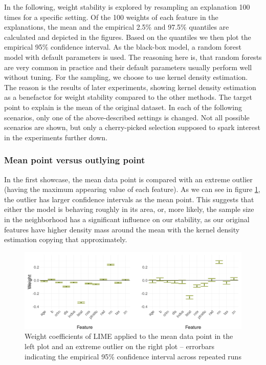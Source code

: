 \documentclass[]{krantz}
\begin{document}
In the following, weight stability is explored by resampling an
explanation 100 times for a specific setting. Of the 100 weights of each
feature in the explanations, the mean and the empirical 2.5\% and 97.5\%
quantiles are calculated and depicted in the figures. Based on the
quantiles we then plot the empirical 95\% confidence interval. As the
black-box model, a random forest model with default parameters is used.
The reasoning here is, that random forests are very common in practice
and their default parameters usually perform well without tuning. For
the sampling, we choose to use kernel density estimation. The reason is
the results of later experiments, showing kernel density estimation as a
benefactor for weight stability compared to the other methods. The
target point to explain is the mean of the original dataset. In each of
the following scenarios, only one of the above-described settings is
changed. Not all possible scenarios are shown, but only a cherry-picked
selection supposed to spark interest in the experiments further down.

\subsubsection{Mean point versus outlying
point}\label{mean-point-versus-outlying-point}

In the first showcase, the mean data point is compared with an extreme
outlier (having the maximum appearing value of each feature). As we can
see in figure \ref{fig:figbostmeanoutlier}, the outlier has larger
confidence intervals as the mean point. This suggests that either the
model is behaving roughly in its area, or, more likely, the sample size
in the neighborhood has a significant influence on our stability, as our
original features have higher density mass around the mean with the
kernel density estimation copying that approximately.

\begin{figure}

{\centering \includegraphics[width=0.99\linewidth]{images/boston_meanVSmax} 

}

\caption{Weight coefficients of LIME applied to the mean data point in the left plot and an extreme outlier on the right plot -- errorbars indicating the empirical 95\% confidence interval across repeated runs}\label{fig:figbostmeanoutlier}
\end{figure}
\end{document}
